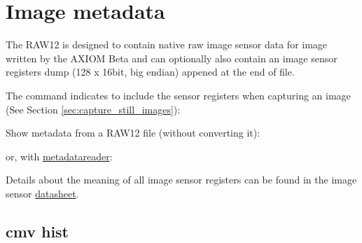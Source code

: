 \section{Image metadata}
The RAW12 is designed to contain native raw image sensor data for image written by the AXIOM Beta and can optionally also contain an image sensor registers dump (128 x 16bit, big endian) appened at the end of file.  

The  command indicates to include the sensor registers when capturing an image (See Section \ref{sec:capture_still_images}):

Show metadata from a RAW12 file (without converting it):


or, with \href{https://github.com/apertus-open-source-cinema/misc-tools-utilities/tree/master/cmv12000-metadata-reader}{metadatareader}:


Details about the meaning of all image sensor registers can be found in the image sensor  \href{https://github.com/apertus-open-source-cinema/beta-hardware/tree/master/Datasheets}{datasheet}. 

\subsection{cmv hist}